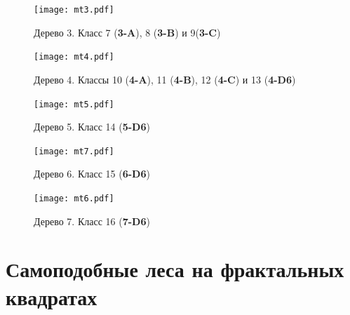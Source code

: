 \begin{figure}[H]
    \centering
    \hspace{0.12\textwidth}
    \texttt{[image: mt3.pdf]}
    \hfill
    \vspace{0.3cm}\vfill
    \hfill
    \caption{Дерево 3. Класс 7 ({\bf 3-A}), 8 ({\bf 3-B}) и 9({\bf 3-C})}
    \label{fig:tree3}
\end{figure}
 
\begin{figure}[H]
    \centering
    \texttt{[image: mt4.pdf]}
    \vspace{0.5cm}\vfill
    \hfill
    \vspace{0.3cm}\vfill
    \hfill
    \caption{Дерево 4. Классы 10 ({\bf 4-A}), 11 ({\bf 4-B}), 12 ({\bf 4-C}) и 13 ({\bf 4-D6})}
    \label{fig:tree4}
\end{figure}

\begin{figure}[H]
    \centering
    \texttt{[image: mt5.pdf]}
    \hfill
    \caption{Дерево 5. Класс 14 ({\bf 5-D6})}
    \label{fig:tree5}
\end{figure}

\begin{figure}[H]
    \centering
    \texttt{[image: mt7.pdf]}
    \hfill
    \caption{Дерево 6. Класс 15 ({\bf 6-D6})}
    \label{fig:tree6}
\end{figure}

\begin{figure}[H]
    \centering
    \texttt{[image: mt6.pdf]}
    \hfill
    \caption{Дерево 7. Класс 16 ({\bf 7-D6})}
    \label{fig:tree7}
\end{figure}



\section{Самоподобные леса на фрактальных квадратах}


